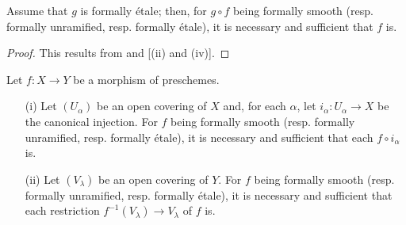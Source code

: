 \begin{corollary}[17.1.5]
\label{IV.17.1.5}
	Assume that $g$ is formally \'etale; then, for $g \circ f$ being formally smooth (resp. formally unramified, resp. formally \'etale), it is necessary and sufficient that $f$ is.
\end{corollary}

\begin{proof}
This results from  and [(ii) and (iv)].
\end{proof}

\begin{proposition}[17.1.6]
\label{IV.17.1.6}
Let $f:X\to Y$ be a morphism of preschemes.
\begin{enumerate}
	\item[(i)] Let $(U_\alpha)$ be an open covering of $X$ and, for each $\alpha$, let $i_\alpha: U_\alpha \to X$ be the canonical injection. For $f$ being formally smooth (resp. formally unramified, resp. formally \'etale), it is necessary and sufficient that each $f \circ i_\alpha$ is.
	\item[(ii)] Let $(V_\lambda)$ be an open covering of $Y$. For $f$ being formally smooth (resp. formally unramified, resp. formally \'etale), it is necessary and sufficient that each restriction $f^{-1}(V_\lambda) \to V_\lambda$ of $f$ is.
\end{enumerate}
\end{proposition}

